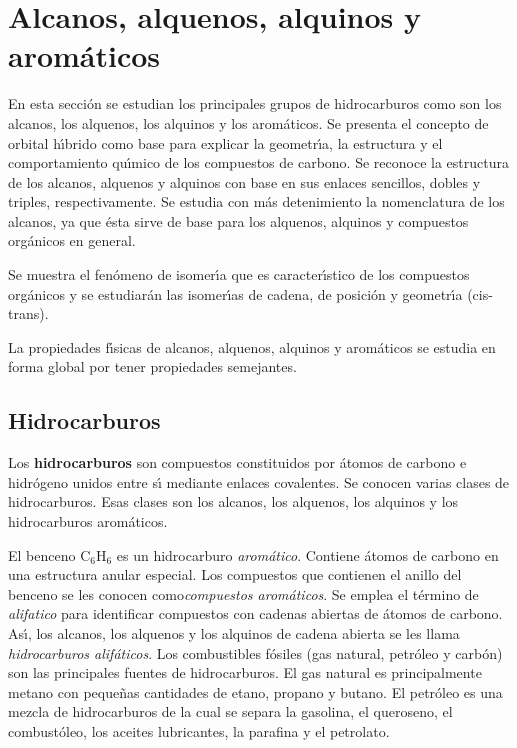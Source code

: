 \section {Alcanos, alquenos, alquinos y aro\-m\'a\-ti\-cos}
\label{aaaro}
En esta secci\'on se estudian los principales grupos de hidrocarburos como son los 
alcanos, los alquenos, los alquinos y los aro\-m\'a\-ti\-cos. Se presenta el concepto de orbital
h\'{\i}brido co\-mo base para explicar la geometr\'{\i}a, la estructura y el
comportamiento qu\'{\i}mico de los compuestos de carbono. Se reconoce la estructura de
los alcanos, alquenos y alquinos con base en sus enlaces sencillos, dobles y triples, 
respectivamente. Se estudia con m\'as detenimiento la nomenclatura de los alcanos, ya
que \'esta sirve de base para los alquenos, alquinos y compuestos org\'anicos en
general.

Se muestra el fen\'omeno de isomer\'{\i}a que es caracter\'{\i}stico de los compuestos org\'anicos y se estudiar\'an las isomer\'{\i}as de cadena, de posici\'on y geometr\'{\i}a (cis-trans).

La propiedades f\'{\i}sicas de alcanos, alquenos, alquinos y arom\'aticos se estudia en
forma global por tener propiedades semejantes.

\subsection{Hidrocarburos}
Los \textbf{\gls{hidrocarburos}}  son compuestos constituidos por \'atomos de carbono e hi\-dr\'o\-ge\-no unidos entre s\'{\i} mediante
enlaces covalentes. Se conocen varias clases de hidrocarburos. Esas clases son los alcanos, los alquenos, los al\-qui\-nos y los hidrocarburos arom\'aticos.

El benceno C$_6$H$_6$ es un hidrocarburo \textit{arom\'atico}. Contiene
\'atomos de car\-bono en una estructura anular especial. Los compuestos que contienen el
 anillo del benceno se les conocen como\textit{compuestos
arom\'aticos}. Se emplea el t\'ermino de \textit{\gls{alifatico}} para identificar compuestos con cadenas abiertas de \'atomos de
carbono. As\'{\i}, los alcanos, los alquenos y los alquinos de cadena abierta se les llama \textit{hidrocarburos alif\'aticos}. Los combustibles f\'osiles (gas natural,
petr\'oleo y carb\'on) son las principales fuentes de hidrocarburos. El gas natural es principalmente metano con pe\-que\-\~nas cantidades de etano, propano y butano. El petr\'oleo es una mezcla de hidrocarburos de la cual se separa la gasolina, el queroseno, el combust\'oleo, los aceites lubricantes, la parafina y el petrolato.

